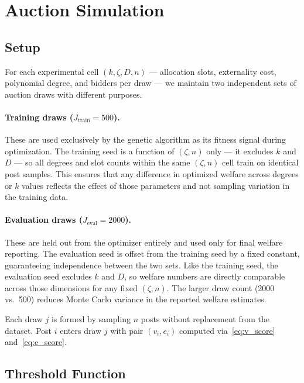 \documentclass[11pt]{article}
\begin{document}
\section{Auction Simulation}
\label{sec:simulation}

\subsection{Setup}

For each experimental cell $(k, \zeta, D, n)$ — allocation slots, externality cost,
polynomial degree, and bidders per draw — we maintain two independent sets of auction
draws with different purposes.

\paragraph{Training draws ($J_{\text{train}} = 500$).}
These are used exclusively by the genetic algorithm as its fitness signal during
optimization.  The training seed is a function of $(\zeta, n)$ only — it excludes $k$
and $D$ — so all degrees and slot counts within the same $(\zeta, n)$ cell train on
identical post samples.  This ensures that any difference in optimized welfare across
degrees or $k$ values reflects the effect of those parameters and not sampling
variation in the training data.

\paragraph{Evaluation draws ($J_{\text{eval}} = 2000$).}
These are held out from the optimizer entirely and used only for final welfare
reporting.  The evaluation seed is offset from the training seed by a fixed constant,
guaranteeing independence between the two sets.  Like the training seed, the
evaluation seed excludes $k$ and $D$, so welfare numbers are directly comparable
across those dimensions for any fixed $(\zeta, n)$.  The larger draw count (2000
vs.\ 500) reduces Monte Carlo variance in the reported welfare estimates.

Each draw $j$ is formed by sampling $n$ posts without replacement from the dataset.
Post $i$ enters draw $j$ with pair $(v_i, e_i)$ computed
via~\eqref{eq:v_score} and~\eqref{eq:e_score}.

\subsection{Threshold Function}
\end{document}
